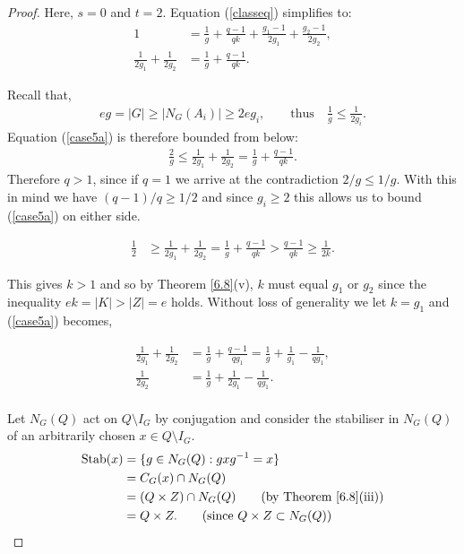 \begin{proof} Here, $s = 0$ and $t = 2$. Equation (\ref{classeq}) simplifies to:
\begin{align} \label{case5a} 1 &= \frac{1}{g} + \frac{q-1}{qk} + \frac{g_1 -1}{2g_1} + \frac{g_2 -1}{2g_2}, \nonumber
\\ 
\frac{1}{2g_1} + \frac{1}{2g_2} &= \frac{1}{g} + \frac{q-1}{qk}. \end{align}

Recall that,
\begin{align*} eg = |G| \geq  |N_G(A_i)| \geq 2eg_i, \qquad \text{thus} \quad \! \frac{1}{g} \leq \frac{1}{2g_i}.
\end{align*}
Equation (\ref{case5a}) is therefore bounded from below:
\begin{align*}  \frac{2}{g} \leq \frac{1}{2g_1} + \frac{1}{2g_2} = \frac{1}{g} + \frac{q-1}{qk}. 
\end{align*}
Therefore $q>1$, since if $q=1$ we arrive at the contradiction $2/g \leq 1/g$. With this in mind we have $(q-1)/q \geq 1/2$ and since $g_i \geq 2$ this allows us to bound (\ref{case5a}) on either side.

\begin{align*} \frac{1}{2} &\geq \frac{1}{2g_1} + \frac{1}{2g_2} = \frac{1}{g} + \frac{q-1}{qk} > \frac{q-1}{qk} \geq \frac{1}{2k}.
\end{align*}

This gives $k > 1$ and so by Theorem \ref{6.8}(v), $k$ must equal $g_1$ or $g_2$ since the inequality $ek = |K| > |Z| = e$ holds. Without loss of generality we let $k=g_1$ and (\ref{case5a}) becomes,

\begin{align} \label{case5b} \frac{1}{2g_1} + \frac{1}{2g_2} &= \frac{1}{g} + \frac{q-1}{qg_1} = \frac{1}{g} + \frac{1}{g_1} - \frac{1}{qg_1}, \nonumber \\[1.5ex]
 \frac{1}{2g_2} &= \frac{1}{g} + \frac{1}{2g_1} - \frac{1}{qg_1}.
\end{align}
\\
Let $N_G(Q)$ act on $Q \! \setminus \! I_G$ by conjugation and consider the stabiliser in $N_G(Q)$ of an arbitrarily chosen $x \in Q \! \setminus \! I_G$.
\begin{align*} \text{Stab}(x) &= \{ g \in N_G(Q) : g x g^{-1} = x \}
\\ &= C_G(x) \cap N_G(Q)
\\ &= (Q \times Z) \cap N_G(Q) \tag{by Theorem \ref{6.8}(iii)}
\\ &= Q \times Z. \tag{since $Q \times Z \subset N_G(Q)$}
\end{align*}


\end{proof}
